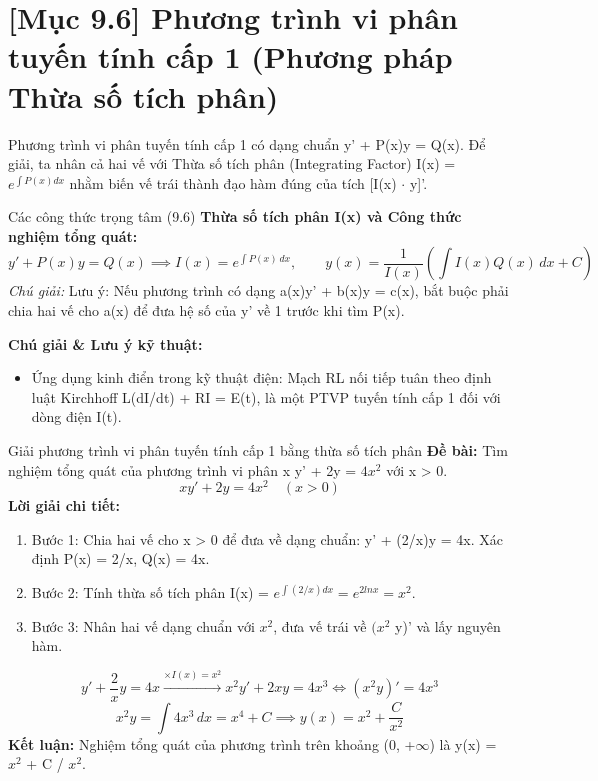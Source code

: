 \documentclass[11pt,a4paper,oneside]{book}
\begin{document}
\section{[Mục 9.6] Phương trình vi phân tuyến tính cấp 1 (Phương pháp Thừa số tích phân)}
Phương trình vi phân tuyến tính cấp 1 có dạng chuẩn y' + P(x)y = Q(x). Để giải, ta nhân cả hai vế với Thừa số tích phân (Integrating Factor) I(x) = $e^{\int P(x)dx}$ nhằm biến vế trái thành đạo hàm đúng của tích [I(x) $\cdot$  y]'.

\begin{congthuc}{Các công thức trọng tâm (9.6)}
\noindent\textbf{Thừa số tích phân I(x) và Công thức nghiệm tổng quát:}
\[ y' + P(x)y = Q(x) \implies I(x) = e^{\int P(x)\,dx}, \qquad y(x) = \frac{1}{I(x)} \left( \int I(x)Q(x)\,dx + C \right) \]
\noindent\textit{Chú giải:} Lưu ý: Nếu phương trình có dạng a(x)y' + b(x)y = c(x), bắt buộc phải chia hai vế cho a(x) để đưa hệ số của y' về 1 trước khi tìm P(x).\\[4pt]
\end{congthuc}

\noindent\textbf{Chú giải \& Lưu ý kỹ thuật:}
\begin{itemize}[leftmargin=1.5em, itemsep=2pt]
  \item Ứng dụng kinh điển trong kỹ thuật điện: Mạch RL nối tiếp tuân theo định luật Kirchhoff L(dI/dt) + RI = E(t), là một PTVP tuyến tính cấp 1 đối với dòng điện I(t).
\end{itemize}

\begin{vidu}{Giải phương trình vi phân tuyến tính cấp 1 bằng thừa số tích phân}
\textbf{Đề bài:} Tìm nghiệm tổng quát của phương trình vi phân x y' + 2y = $4x^2$ với x > 0.
\[ x y' + 2y = 4x^2 \quad (x > 0) \]
\textbf{Lời giải chi tiết:}
\begin{enumerate}[leftmargin=1.5em, itemsep=2pt]
  \item Bước 1: Chia hai vế cho x > 0 để đưa về dạng chuẩn: y' + (2/x)y = 4x. Xác định P(x) = 2/x, Q(x) = 4x.
  \item Bước 2: Tính thừa số tích phân I(x) = $e^{\int (2/x)dx} = e^{2 ln x} = x^2$.
  \item Bước 3: Nhân hai vế dạng chuẩn với $x^2$, đưa vế trái về $(x^2$ y)' và lấy nguyên hàm.
\end{enumerate}
\[ y' + \frac{2}{x}y = 4x \xrightarrow{\times I(x) = x^2} x^2 y' + 2xy = 4x^3 \iff (x^2 y)' = 4x^3 \]
\[ x^2 y = \int 4x^3\,dx = x^4 + C \implies y(x) = x^2 + \frac{C}{x^2} \]
\noindent\textbf{Kết luận:} Nghiệm tổng quát của phương trình trên khoảng (0, +$\infty$) là y(x) = $x^2$ + C / $x^2$.
\end{vidu}
\end{document}

